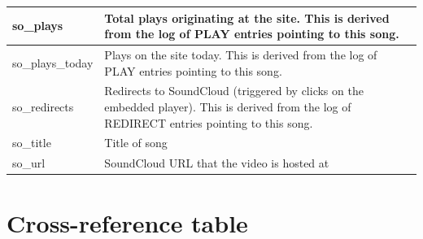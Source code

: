 \documentclass[11pt, a4paper]{report}
\begin{document}
\begin{longtable}{|l|p{10cm}|}
so\_plays               & Total plays originating at the site. This is derived from the log of PLAY entries pointing to this song.                                                              \\ \hline
so\_plays\_today        & Plays on the site today. This is derived from the log of PLAY entries pointing to this song.                                                                          \\ \hline
so\_redirects           & Redirects to SoundCloud (triggered by clicks on the embedded player). This is derived from the log of REDIRECT entries pointing to this song.                         \\ \hline
so\_title               & Title of song                                                                                                                                                         \\ \hline
so\_url                 & SoundCloud URL that the video is hosted at                                                                                                                            \\ \hline

\end{longtable}


\clearpage
\section{Cross-reference table}
\end{document}
